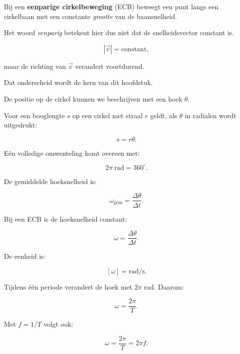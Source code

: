 \documentclass{ximera}
\begin{document}


\begin{definitie}
Bij een \textbf{eenparige cirkelbeweging} (ECB) beweegt een punt langs
een cirkelbaan met een constante \emph{grootte} van de baansnelheid.
\end{definitie}

Het woord \emph{eenparig} betekent hier dus niet dat de
snelheidsvector constant is.

\[
|\vec v|=\text{constant},
\]

maar de richting van $\vec v$ verandert voortdurend.

Dat onderscheid wordt de kern van dit hoofdstuk.



De positie op de cirkel kunnen we beschrijven met een hoek $\theta$.

Voor een booglengte $s$ op een cirkel met straal $r$ geldt, als
$\theta$ in radialen wordt uitgedrukt:

\[
\boxed{s=r\theta}.
\]

Eén volledige omwenteling komt overeen met:

\[
\boxed{2\pi\ \mathrm{rad}=360^\circ}.
\]



De gemiddelde hoeksnelheid is:

\[
\omega_{\mathrm{gem}}
=
\frac{\Delta\theta}{\Delta t}.
\]

Bij een ECB is de hoeksnelheid constant:

\[
\boxed{\omega=\frac{\Delta\theta}{\Delta t}}.
\]

De eenheid is:

\[
[\omega]=\mathrm{rad/s}.
\]

Tijdens één periode verandert de hoek met $2\pi$ rad. Daarom:

\[
\omega
=
\frac{2\pi}{T}.
\]

Met $f=1/T$ volgt ook:

\[
\boxed{
\omega=\frac{2\pi}{T}=2\pi f.
}
\]
\end{document}
